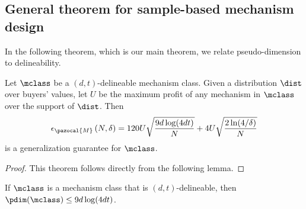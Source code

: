 \subsection{General theorem for sample-based mechanism design}

In the following theorem, which is our main theorem, we relate pseudo-dimension to delineability.

\begin{theorem}\label{thm:main_pdim}
Let $\mclass$ be a $\left(d, t\right)$-delineable mechanism class. Given a distribution $\dist$ over buyers' values, let $U$ be the maximum profit of any mechanism in $\mclass$ over the support of $\dist$. Then \[\epsilon_{\pazocal{M}}\left(N, \delta\right) = 120U\sqrt{\frac{9d \log (4dt)}{N}} + 4U \sqrt{\frac{2\ln(4/\delta)}{N}}\] is a generalization guarantee for $\mclass$.
\end{theorem}

\begin{proof}
This theorem follows directly from the following lemma.
\end{proof}

\begin{lemma}\label{lem:main_pdim}
If $\mclass$ is a mechanism class that is $\left(d, t\right)$-delineable, then $\pdim(\mclass) \leq 9d \log (4dt)$.
\end{lemma}

